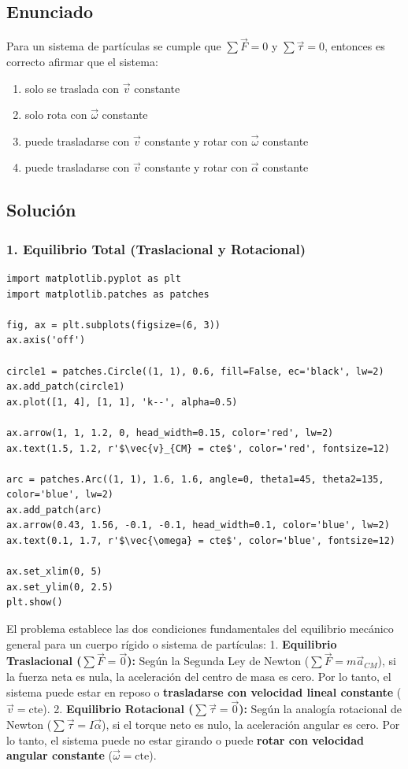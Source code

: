 \documentclass[12pt, a4paper]{article}
\begin{document}
\newpage

\subsection*{Enunciado}
Para un sistema de partículas se cumple que $\sum \vec{F} = 0$ y $\sum \vec{\tau} = 0$, entonces es correcto afirmar que el sistema:
\begin{enumerate}[label=\alph*)]
    \item solo se traslada con $\vec{v}$ constante
    \item solo rota con $\vec{\omega}$ constante
    \item puede trasladarse con $\vec{v}$ constante y rotar con $\vec{\omega}$ constante
    \item puede trasladarse con $\vec{v}$ constante y rotar con $\vec{\alpha}$ constante
\end{enumerate}

\subsection*{Solución}

\subsubsection*{1. Equilibrio Total (Traslacional y Rotacional)}

\begin{verbatim}
import matplotlib.pyplot as plt
import matplotlib.patches as patches

fig, ax = plt.subplots(figsize=(6, 3))
ax.axis('off')

circle1 = patches.Circle((1, 1), 0.6, fill=False, ec='black', lw=2)
ax.add_patch(circle1)
ax.plot([1, 4], [1, 1], 'k--', alpha=0.5)

ax.arrow(1, 1, 1.2, 0, head_width=0.15, color='red', lw=2)
ax.text(1.5, 1.2, r'$\vec{v}_{CM} = cte$', color='red', fontsize=12)

arc = patches.Arc((1, 1), 1.6, 1.6, angle=0, theta1=45, theta2=135, color='blue', lw=2)
ax.add_patch(arc)
ax.arrow(0.43, 1.56, -0.1, -0.1, head_width=0.1, color='blue', lw=2)
ax.text(0.1, 1.7, r'$\vec{\omega} = cte$', color='blue', fontsize=12)

ax.set_xlim(0, 5)
ax.set_ylim(0, 2.5)
plt.show()
\end{verbatim}

El problema establece las dos condiciones fundamentales del equilibrio mecánico general para un cuerpo rígido o sistema de partículas:
1. \textbf{Equilibrio Traslacional ($\sum \vec{F} = \vec{0}$):} Según la Segunda Ley de Newton ($\sum \vec{F} = m\vec{a}_{CM}$), si la fuerza neta es nula, la aceleración del centro de masa es cero. Por lo tanto, el sistema puede estar en reposo o \textbf{trasladarse con velocidad lineal constante} ($\vec{v} = \text{cte}$).
2. \textbf{Equilibrio Rotacional ($\sum \vec{\tau} = \vec{0}$):} Según la analogía rotacional de Newton ($\sum \vec{\tau} = I\vec{\alpha}$), si el torque neto es nulo, la aceleración angular es cero. Por lo tanto, el sistema puede no estar girando o puede \textbf{rotar con velocidad angular constante} ($\vec{\omega} = \text{cte}$).
\end{document}
